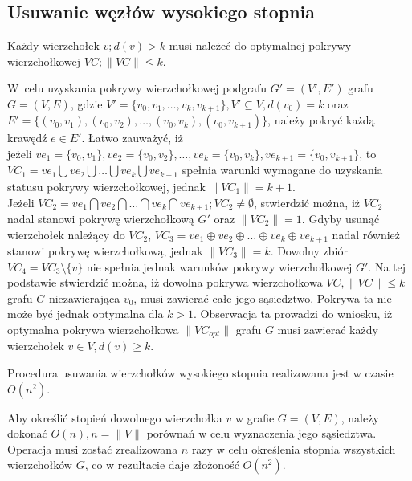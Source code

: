 \subsection{Usuwanie węzłów wysokiego stopnia}\label{section_kernelization_high-degree}

\begin{theorem}
  Każdy wierzchołek $v; d(v) > k$ musi należeć do optymalnej pokrywy wierzchołkowej 
  $VC; \|VC\| \leq k$.
\end{theorem}
\begin{bproof}
  W~celu uzyskania pokrywy wierzchołkowej podgrafu $G\prime=(V\prime,E\prime)$
  grafu $G=(V,E)$, gdzie $V\prime=\{v_0, v_1, \ldots, v_k, v_{k+1}\}, V\prime
  \subseteq V, d(v_0)=k$ oraz \\
  $E\prime=\{(v_0,v_1), (v_0,v_2), \ldots, (v_0, v_k), (v_0,v_{k+1})\}$,
  należy pokryć każdą krawędź $e \in E\prime$.
  Łatwo zauważyć, iż \\ jeżeli $ve_1=\{v_0,v_1\}, ve_2=\{v_0,v_2\}, \ldots,
  ve_k=\{v_0,v_k\},ve_{k+1}=\{v_0,v_{k+1}\}$,
  to ${VC_1=ve_1 \bigcup ve_2 \bigcup \ldots \bigcup ve_k \bigcup ve_{k+1}}$ spełnia warunki 
  wymagane do uzyskania statusu pokrywy wierzchołkowej, jednak $\|VC_1\| = k +1$.\\
  Jeżeli $VC_2=ve_1 \bigcap ve_2 \bigcap \ldots \bigcap ve_k \bigcap ve_{k+1}; VC_2 \neq \emptyset$,
  stwierdzić można, iż $VC_2$ nadal stanowi pokrywę wierzchołkową $G\prime$ oraz
  $\|VC_2\|=1$.
  Gdyby usunąć wierzchołek należący do $VC_2$, $VC_3=ve_1 \oplus ve_2 \oplus \ldots \oplus ve_k \oplus ve_{k+1}$ nadal
  również stanowi pokrywę wierzchołkową, jednak $\|VC_3\|=k$.
  Dowolny zbiór $VC_4=VC_3 \setminus \{v\}$ nie spełnia jednak warunków pokrywy
  wierzchołkowej $G\prime$.
  Na tej podstawie stwierdzić można, iż dowolna pokrywa wierzchołkowa 
  $VC, \|VC\| \leq k$ grafu $G$ niezawierająca $v_0$, musi zawierać całe jego
  sąsiedztwo. Pokrywa ta nie może być jednak optymalna dla $k > 1$.
  Obserwacja ta prowadzi do wniosku, iż optymalna pokrywa wierzchołkowa
  $\|VC_{opt}\|$ grafu $G$ musi zawierać każdy wierzchołek $v \in V, d(v) \geq k$.
\end{bproof}

\begin{theorem}
  Procedura usuwania wierzchołków wysokiego stopnia realizowana jest w czasie
  $O(n^2)$.
\end{theorem}
\begin{bproof}
  Aby określić stopień dowolnego wierzchołka $v$ w grafie $G=(V,E)$, należy 
  dokonać $O(n), n=\|V\|$ porównań w celu wyznaczenia jego sąsiedztwa.
  Operacja musi zostać zrealizowana $n$ razy w celu określenia stopnia
  wszystkich wierzchołków $G$, co w rezultacie daje złożoność $O (n^2)$.
\end{bproof}

